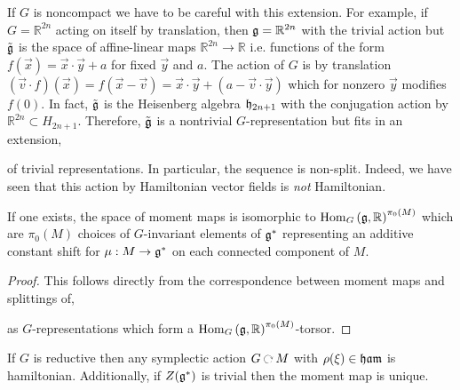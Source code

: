 \documentclass[12pt]{extarticle}
\newcommand{\R}{\mathbb{R}}
\begin{document}
\begin{rmk}
If $G$ is noncompact we have to be careful with this extension. For example, if $G = \R^{2n}$ acting on itself by translation, then $\g = \R^{2n}$ with the trivial action but $\tilde{\mathfrak{g}}$ is the space of affine-linear maps $\R^{2n} \to \R$ i.e. functions of the form $f(\vec{x}) = \vec{x} \cdot \vec{y} + a$ for fixed $\vec{y}$ and $a$. The action of $G$ is by translation $(\vec{v} \cdot f)(\vec{x}) = f(\vec{x} - \vec{v}) = \vec{x} \cdot \vec{y} + (a - \vec{v} \cdot \vec{y})$ which for nonzero $\vec{y}$ modifies $f(0)$. In fact, $\tilde{\mathfrak{g}}$ is the Heisenberg algebra $\mathfrak{h}_{2n + 1}$ with the conjugation action by $\R^{2n} \subset H_{2n+1}$. Therefore, $\tilde{\mathfrak{g}}$ is a nontrivial $G$-representation but fits in an extension,
\begin{center}
\end{center} 
of trivial representations. In particular, the sequence is non-split. Indeed, we have seen that this action by Hamiltonian vector fields is \textit{not} Hamiltonian. 
\end{rmk}

\begin{cor}
If one exists, the space of moment maps is isomorphic to $\Hom{G}{\g}{\R}^{\pi_0(M)}$ which are $\pi_0(M)$ choices of $G$-invariant elements of $\mathfrak{g}^*$ representing an additive constant shift for $\mu : M \to \mathfrak{g}^*$ on each connected component of $M$.
\end{cor}

\begin{proof}
This follows directly from the correspondence between moment maps and splittings of,
\begin{center}
\end{center}
as $G$-representations which form a $\Hom{G}{\g}{\R}^{\pi_0(M)}$-torsor.
\end{proof}

\begin{prop}
If $G$ is reductive then any symplectic action $G \acts M$ with $\rho(\xi) \in \mathfrak{ham}$ is hamiltonian. Additionally, if $Z(\mathfrak{g}^*)$ is trivial then the moment map is unique.
\end{prop}
\end{document}
